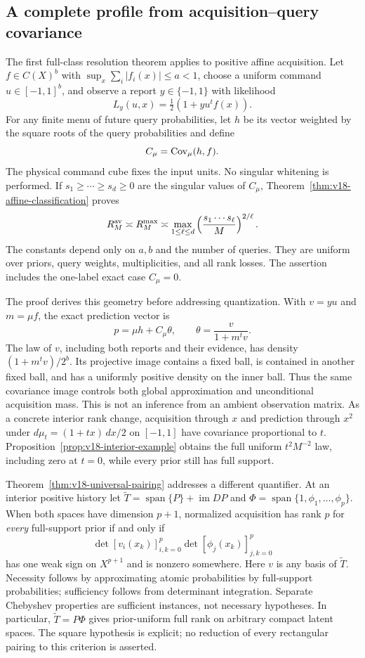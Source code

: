 \documentclass[11pt]{amsart}
\theoremstyle{definition}\newtheorem{definition}[theorem]{Definition}
\theoremstyle{remark}\newtheorem{remark}[theorem]{Remark}
\begin{document}
\subsection{A complete profile from acquisition--query covariance}
The first full-class resolution theorem applies to positive affine
acquisition. Let $f\in C(X)^b$ with
$\sup_x\sum_i|f_i(x)|\le a<1$, choose a uniform command
$u\in[-1,1]^b$, and observe a report $y\in\{-1,1\}$ with likelihood
\[
 L_y(u,x)=\tfrac12(1+y u^tf(x)).
\]
For any finite menu of future query probabilities, let $h$ be its vector
weighted by the square roots of the query probabilities and define
\[
 C_\mu=\operatorname{Cov}_\mu(h,f).
\]
The physical command cube fixes the input units. No singular whitening
is performed. If $s_1\ge\cdots\ge s_d\ge0$ are the singular values
of $C_\mu$, Theorem~\ref{thm:v18-affine-classification} proves
\[
 R_M^{\rm av}\asymp R_M^{\rm max}\asymp
 \max_{1\le\ell\le d}
      \left(\frac{s_1\cdots s_\ell}{M}\right)^{2/\ell}.
\]
The constants depend only on $a,b$ and the number of queries. They are
uniform over priors, query weights, multiplicities, and all rank losses.
The assertion includes the one-label exact case $C_\mu=0$.

The proof derives this geometry before addressing quantization. With
$v=yu$ and $m=\mu f$, the exact prediction vector is
\[
 p=\mu h+C_\mu\theta,\qquad
 \theta=\frac{v}{1+m^tv}.
\]
The law of $v$, including both reports and their evidence, has density
$(1+m^tv)/2^b$. Its projective image contains a fixed ball, is contained
in another fixed ball, and has a uniformly positive density on the
inner ball. Thus the same covariance image controls both global
approximation and unconditional acquisition mass. This is not an
inference from an ambient observation matrix. As a concrete interior
rank change, acquisition through $x$ and prediction through $x^2$ under
$d\mu_t=(1+tx)\,dx/2$ on $[-1,1]$ have covariance proportional to
$t$. Proposition~\ref{prop:v18-interior-example} obtains the full
uniform $t^2M^{-2}$ law, including zero at $t=0$, while every prior
still has full support.

Theorem~\ref{thm:v18-universal-pairing} addresses a different
quantifier. At an interior positive history let
$\widetilde T=\operatorname{span}\{P\}+\operatorname{im}DP$ and
$\Phi=\operatorname{span}\{1,\phi_1,\ldots,\phi_p\}$. When both
spaces have dimension $p+1$, normalized acquisition has rank $p$ for
\emph{every} full-support prior if and only if
\[
 \det[v_i(x_k)]_{i,k=0}^p\det[\phi_j(x_k)]_{j,k=0}^p
\]
has one weak sign on $X^{p+1}$ and is nonzero somewhere. Here $v$ is
any basis of $\widetilde T$. Necessity follows by approximating atomic
probabilities by full-support probabilities; sufficiency follows from
determinant integration. Separate Chebyshev properties are sufficient
instances, not necessary hypotheses. In particular,
$\widetilde T=P\Phi$ gives prior-uniform full rank on arbitrary compact
latent spaces. The square hypothesis is explicit; no reduction of every
rectangular pairing to this criterion is asserted.
\end{document}
